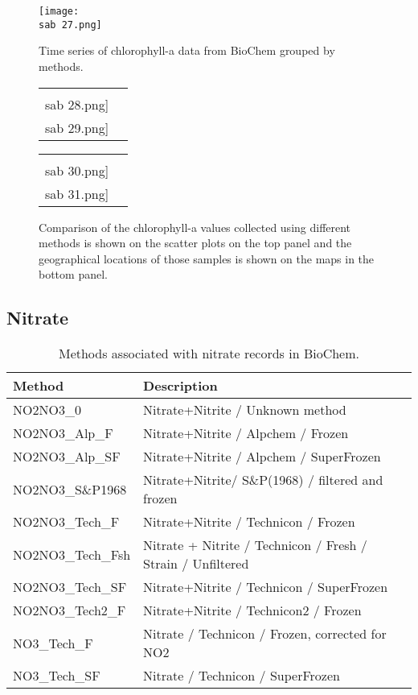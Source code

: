 \documentclass[letterpaper,portrait,11pt]{scrartcl}
\numberwithin{equation}{section}		%
\numberwithin{figure}{section}		%
\numberwithin{table}{section}				%
\newcommand{\ecomod}{\string~/ecomod_data/}   %
\newcommand{\sab}{\ecomod/mpa/sab/}   %
\begin{document}
\begin{appendices}
\begin{figure}[h]
  \label{fig:ChlaTimeseries}
  \centering
  \texttt{[image: \\sab 27.png]}
  \caption{Time series of chlorophyll-a data from BioChem grouped by methods.}
\end{figure}


\begin{figure}[h]
  \label{fig:ChlaComparison}
  \centering
  \begin{tabular}{cc}
    \texttt{[image: \\sab 28.png]}
    \texttt{[image: \\sab 29.png]} 
  \end{tabular}
  \begin{tabular}{cc}
    \texttt{[image: \\sab 30.png]}
    \texttt{[image: \\sab 31.png]}
  \end{tabular}
  \caption{Comparison of the chlorophyll-a values collected using different methods is shown on the scatter plots on the top panel and the geographical locations of those samples is shown on the maps in the bottom panel.}
\end{figure}



\clearpage

\subsection{Nitrate}

% 
\begin{table}[h]
  \label{table:Nmethods}
  \caption{Methods associated with nitrate records in BioChem.}
  \begin{tabular}{ll}
    Method & Description\\
    \hline
    NO2NO3\_0 & Nitrate+Nitrite / Unknown method \\
    NO2NO3\_Alp\_F & Nitrate+Nitrite / Alpchem / Frozen \\
    NO2NO3\_Alp\_SF & Nitrate+Nitrite / Alpchem / SuperFrozen \\
    NO2NO3\_S\&P1968 & Nitrate+Nitrite/ S\&P(1968) / filtered and frozen \\
    NO2NO3\_Tech\_F & Nitrate+Nitrite / Technicon / Frozen \\
    NO2NO3\_Tech\_Fsh & Nitrate + Nitrite / Technicon / Fresh / Strain / Unfiltered \\
    NO2NO3\_Tech\_SF & Nitrate+Nitrite / Technicon / SuperFrozen \\
    NO2NO3\_Tech2\_F & Nitrate+Nitrite / Technicon2 / Frozen \\
    NO3\_Tech\_F & Nitrate / Technicon / Frozen, corrected for NO2 \\
    NO3\_Tech\_SF & Nitrate / Technicon / SuperFrozen\\
  \end{tabular}
\end{table}


\end{appendices}
\end{document}
